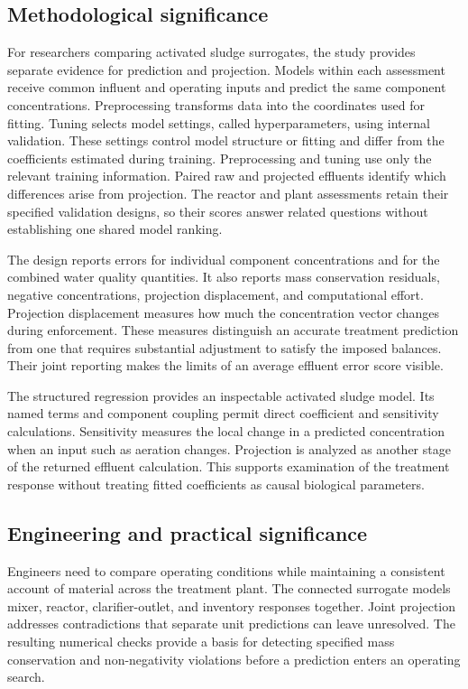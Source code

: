 \subsection{Methodological significance}

For researchers comparing activated sludge surrogates, the study provides separate evidence for prediction and projection. Models within each assessment receive common influent and operating inputs and predict the same component concentrations. Preprocessing transforms data into the coordinates used for fitting. Tuning selects model settings, called hyperparameters, using internal validation. These settings control model structure or fitting and differ from the coefficients estimated during training. Preprocessing and tuning use only the relevant training information. Paired raw and projected effluents identify which differences arise from projection. The reactor and plant assessments retain their specified validation designs, so their scores answer related questions without establishing one shared model ranking.

The design reports errors for individual component concentrations and for the combined water quality quantities. It also reports mass conservation residuals, negative concentrations, projection displacement, and computational effort. Projection displacement measures how much the concentration vector changes during enforcement. These measures distinguish an accurate treatment prediction from one that requires substantial adjustment to satisfy the imposed balances. Their joint reporting makes the limits of an average effluent error score visible.

The structured regression provides an inspectable activated sludge model. Its named terms and component coupling permit direct coefficient and sensitivity calculations. Sensitivity measures the local change in a predicted concentration when an input such as aeration changes. Projection is analyzed as another stage of the returned effluent calculation. This supports examination of the treatment response without treating fitted coefficients as causal biological parameters.

\subsection{Engineering and practical significance}

Engineers need to compare operating conditions while maintaining a consistent account of material across the treatment plant. The connected surrogate models mixer, reactor, clarifier-outlet, and inventory responses together. Joint projection addresses contradictions that separate unit predictions can leave unresolved. The resulting numerical checks provide a basis for detecting specified mass conservation and non-negativity violations before a prediction enters an operating search.

